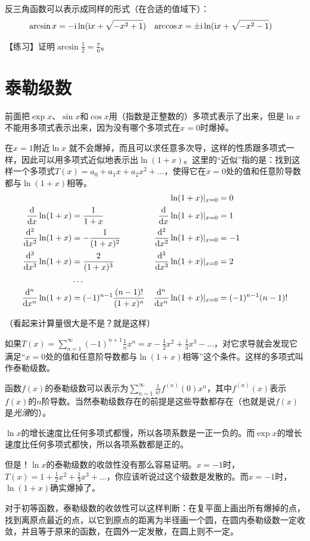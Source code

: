 反三角函数可以表示成同样的形式（在合适的值域下）：
\begin{align*}
\arcsin x&=-\mathrm{i} \ln(\mathrm{i} x+\sqrt{-x^2+1}) & \arccos x&=\pm \mathrm{i} \ln(\mathrm{i} x+\sqrt{-x^2-1})
\end{align*}

【练习】证明$\arcsin \frac{1}{2}=\frac{\pi}{6}$。
\section{泰勒级数}
前面把$\exp x$、$\sin x$和$\cos x$用（指数是正整数的）多项式表示了出来，但是$\ln x$不能用多项式表示出来，因为没有哪个多项式在$x=0$时爆掉。

在$x=1$附近$\ln x$ 就不会爆掉，而且可以求任意多次导，这样的性质跟多项式一样，因此可以用多项式近似地表示出$\ln(1+x)$。这里的“近似”指的是：找到这样一个多项式$T(x)=a_0+a_1 x+a_2 x^2+\dots$，使得它在$x=0$处的值和任意阶导数都与$\ln(1+x)$相等。
\begin{align*}
& & \ln(1+x)|_{x=0}&=0 \\
\ddx \ln(1+x)&=\frac{1}{1+x} & \ddx \ln(1+x)|_{x=0}&=1 \\
\ddxn{2} \ln(1+x)&=-\frac{1}{(1+x)^2} & \ddxn{2} \ln(1+x)|_{x=0}&=-1 \\
\ddxn{3} \ln(1+x)&=\frac{2}{(1+x)^3} & \ddxn{3} \ln(1+x)|_{x=0}&=2 \\
&\dots \\
\ddxn{n} \ln(1+x)&=(-1)^{n-1} \frac{(n-1)!}{(1+x)^n} & \ddxn{n} \ln(1+x)|_{x=0}&=(-1)^{n-1} (n-1)!
\end{align*}

（看起来计算量很大是不是？就是这样）

如果$T(x)=\sum_{n=1}^{\infty} (-1)^{n+1} \frac{1}{n} x^n=x-\frac{1}{2}x^2+\frac{1}{3}x^3-\dots$，对它求导就会发现它满足“$x=0$处的值和任意阶导数都与$\ln(1+x)$相等”这个条件。这样的多项式叫作泰勒级数。

函数$f(x)$的泰勒级数可以表示为$\sum_{n=1}^{\infty} \frac{1}{n!} f^{(n)}(0) x^n$，其中$f^{(n)}(x)$表示$f(x)$的$n$阶导数。当然泰勒级数存在的前提是这些导数都存在（也就是说$f(x)$是\emph{光滑}的）。

$\ln x$的增长速度比任何多项式都慢，所以各项系数是一正一负的。而$\exp x$的增长速度比任何多项式都快，所以各项系数都是正的。

但是！$\ln x$的泰勒级数的收敛性没有那么容易证明。$x=-1$时，$T(x)=1+\frac{1}{2}x^2+\frac{1}{3}x^3+\dots$，你应该听说过这个级数是发散的。而$x=-1$时，$\ln(1+x)$确实爆掉了。

对于初等函数，泰勒级数的收敛性可以这样判断：在复平面上画出所有爆掉的点，找到离原点最近的点，以它到原点的距离为半径画一个圆，在圆内泰勒级数一定收敛，并且等于原来的函数，在圆外一定发散，在圆上则不一定。

